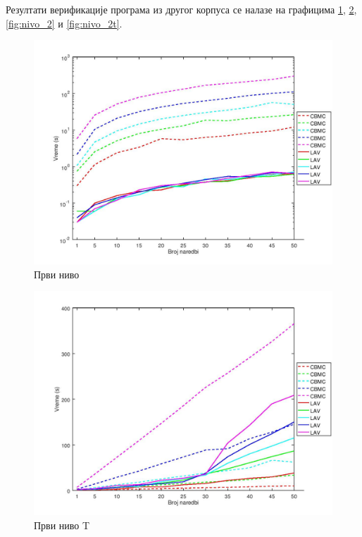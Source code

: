 \documentclass[12pt,oneside]{memoir}
\begin{document}
  Резултати верификације програма из другог корпуса се налазе на графицима \ref{fig:nivo_1}, \ref{fig:nivo_1t}, \ref{fig:nivo_2} и \ref{fig:nivo_2t}.   

\begin{figure}[!ht]
  \centering
  \includegraphics[width=1.0\textwidth]{img/nivo_1a.jpg}
  \caption{Први ниво}
  \label{fig:nivo_1}
\end{figure}

\begin{figure}[!ht]
  \centering
  \includegraphics[width=1.0\textwidth]{img/nivo_1Ta.jpg}
  \caption{Први ниво T}
  \label{fig:nivo_1t}
\end{figure}
\end{document}
